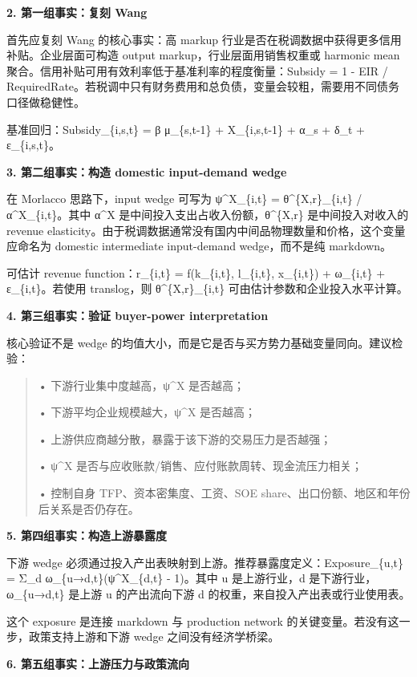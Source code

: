 \documentclass[
  12pt,
]{ctexart}
\begin{document}
\textbf{2. 第一组事实：复刻 Wang}

首先应复刻 Wang 的核心事实：高 markup 行业是否在税调数据中获得更多信用补贴。企业层面可构造 output markup，行业层面用销售权重或 harmonic mean 聚合。信用补贴可用有效利率低于基准利率的程度衡量：Subsidy = 1 - EIR / RequiredRate。若税调中只有财务费用和总负债，变量会较粗，需要用不同债务口径做稳健性。

基准回归：Subsidy\_\{i,s,t\} = β μ\_\{s,t-1\} + X\_\{i,s,t-1\} + α\_s + δ\_t + ε\_\{i,s,t\}。

\textbf{3. 第二组事实：构造 domestic input-demand wedge}

在 Morlacco 思路下，input wedge 可写为 ψ\^{}X\_\{i,t\} = θ\^{}\{X,r\}\_\{i,t\} / α\^{}X\_\{i,t\}。其中 α\^{}X 是中间投入支出占收入份额，θ\^{}\{X,r\} 是中间投入对收入的 revenue elasticity。由于税调数据通常没有国内中间品物理数量和价格，这个变量应命名为 domestic intermediate input-demand wedge，而不是纯 markdown。

可估计 revenue function：r\_\{i,t\} = f(k\_\{i,t\}, l\_\{i,t\}, x\_\{i,t\}) + ω\_\{i,t\} + ε\_\{i,t\}。若使用 translog，则 θ\^{}\{X,r\}\_\{i,t\} 可由估计参数和企业投入水平计算。

\textbf{4. 第三组事实：验证 buyer-power interpretation}

核心验证不是 wedge 的均值大小，而是它是否与买方势力基础变量同向。建议检验：

\begin{quote}
• 下游行业集中度越高，ψ\^{}X 是否越高；

• 下游平均企业规模越大，ψ\^{}X 是否越高；

• 上游供应商越分散，暴露于该下游的交易压力是否越强；

• ψ\^{}X 是否与应收账款/销售、应付账款周转、现金流压力相关；

• 控制自身 TFP、资本密集度、工资、SOE share、出口份额、地区和年份后关系是否仍存在。
\end{quote}

\textbf{5. 第四组事实：构造上游暴露度}

下游 wedge 必须通过投入产出表映射到上游。推荐暴露度定义：Exposure\_\{u,t\} = Σ\_d ω\_\{u→d,t\}(ψ\^{}X\_\{d,t\} - 1)。其中 u 是上游行业，d 是下游行业，ω\_\{u→d,t\} 是上游 u 的产出流向下游 d 的权重，来自投入产出表或行业使用表。

这个 exposure 是连接 markdown 与 production network 的关键变量。若没有这一步，政策支持上游和下游 wedge 之间没有经济学桥梁。

\textbf{6. 第五组事实：上游压力与政策流向}
\end{document}
